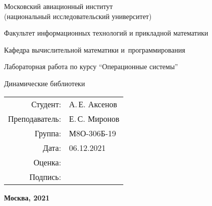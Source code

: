 \begin{titlepage}
\begin{center}
\bfseries

{\Large Московский авиационный институт\\ (национальный исследовательский университет)}

\vspace{48pt}

{\large Факультет информационных технологий и прикладной математики
}

{\large Кафедра вычислительной математики и~программирования}


\vspace{48pt}

Лабораторная работа  по курсу \enquote{Операционные системы}

\vspace{24pt}

{\Large Динамические библиотеки}

\end{center}

\vspace{72pt}

\begin{flushright}
\begin{tabular}{rl}
Студент: & А.\,Е. Аксенов \\
Преподаватель: & Е.\,С. Миронов  \\
Группа: & М8О-306Б-19 \\
Дата: & 06.12.2021 \\
Оценка: & \\
Подпись: & \\
\end{tabular}
\end{flushright}

\vfill

\begin{center}
\bfseries
Москва, 2021
\end{center}
\end{titlepage}

\pagebreak

